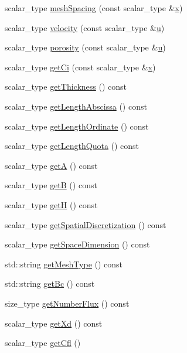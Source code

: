 \begin{DoxyCompactItemize}
\item 
scalar\-\_\-type \hyperlink{classFractureData_ab79d66dd830b6e1c55ade0d940c5c8cf}{mesh\-Spacing} (const scalar\-\_\-type \&\hyperlink{risultati__bastian_8m_a9336ebf25087d91c818ee6e9ec29f8c1}{x})
\item 
scalar\-\_\-type \hyperlink{classFractureData_a9598cf66a822a593e819df754420a2c2}{velocity} (const scalar\-\_\-type \&\hyperlink{god__e_8m_a5d13973cebbcfb3c9181cd74c7bc1812}{u})
\item 
scalar\-\_\-type \hyperlink{classFractureData_aab77ec8a8d3e878b5dfb72deb48841e7}{porosity} (const scalar\-\_\-type \&\hyperlink{god__e_8m_a5d13973cebbcfb3c9181cd74c7bc1812}{u})
\item 
scalar\-\_\-type \hyperlink{classFractureData_a142a1bb428365b60ed002362ca566517}{get\-Ci} (const scalar\-\_\-type \&\hyperlink{risultati__bastian_8m_a9336ebf25087d91c818ee6e9ec29f8c1}{x})
\item 
scalar\-\_\-type \hyperlink{classFractureData_a3ecc0d132f9cc105af6b24d676a7b9c5}{get\-Thickness} () const 
\item 
scalar\-\_\-type \hyperlink{classFractureData_abaebcf16d83713858e25837939ad3161}{get\-Length\-Abscissa} () const 
\item 
scalar\-\_\-type \hyperlink{classFractureData_a905e953f685b1329ddcc7ee56f8302b1}{get\-Length\-Ordinate} () const 
\item 
scalar\-\_\-type \hyperlink{classFractureData_a79747fff53da9d858950d83ad0114288}{get\-Length\-Quota} () const 
\item 
scalar\-\_\-type \hyperlink{classFractureData_aea2090efbba4e6aaa89e90864a1d46f6}{get\-A} () const 
\item 
scalar\-\_\-type \hyperlink{classFractureData_ad8a5510e522711cc9f2430a0b9fadc70}{get\-B} () const 
\item 
scalar\-\_\-type \hyperlink{classFractureData_a7ef5fdbdc462f4135d44102d2017c63b}{get\-H} () const 
\item 
scalar\-\_\-type \hyperlink{classFractureData_aeb3c6a78af1e2746bf5ce69c9ae8945d}{get\-Spatial\-Discretization} () const 
\item 
scalar\-\_\-type \hyperlink{classFractureData_a4b310767d1a91b0cef404093aacfab82}{get\-Space\-Dimension} () const 
\item 
std\-::string \hyperlink{classFractureData_aaded6c0452470489beb4ab95b5f4158f}{get\-Mesh\-Type} () const 
\item 
std\-::string \hyperlink{classFractureData_a2df7c1f0a0722878d4ccdca537605dac}{get\-Bc} () const 
\item 
size\-\_\-type \hyperlink{classFractureData_ab6b8416e26e0b37b9789d83336d37fef}{get\-Number\-Flux} () const 
\item 
scalar\-\_\-type \hyperlink{classFractureData_a875649432017de65d85176395e42376c}{get\-Xd} () const 
\item 
scalar\-\_\-type \hyperlink{classFractureData_a2695260e58e519fc0fa1c79a475d776d}{get\-Cfl} ()
\end{DoxyCompactItemize}


